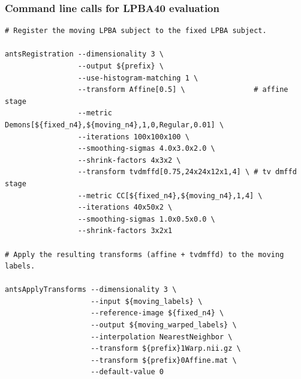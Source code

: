 \documentclass[xcolor=dvipsnames,serif,10pt]{beamer}
\begin{document}

\begin{frame}[fragile]
\frametitle{Command line calls for LPBA40 evaluation}
\begin{lstlisting}
# Register the moving LPBA subject to the fixed LPBA subject.

antsRegistration --dimensionality 3 \
                 --output ${prefix} \
                 --use-histogram-matching 1 \
                 --transform Affine[0.5] \                # affine stage
                 --metric Demons[${fixed_n4},${moving_n4},1,0,Regular,0.01] \ 
                 --iterations 100x100x100 \
                 --smoothing-sigmas 4.0x3.0x2.0 \
                 --shrink-factors 4x3x2 \
                 --transform tvdmffd[0.75,24x24x12x1,4] \ # tv dmffd stage
                 --metric CC[${fixed_n4},${moving_n4},1,4] \ 
                 --iterations 40x50x2 \
                 --smoothing-sigmas 1.0x0.5x0.0 \
                 --shrink-factors 3x2x1

# Apply the resulting transforms (affine + tvdmffd) to the moving labels.
                   
antsApplyTransforms --dimensionality 3 \
                    --input ${moving_labels} \
                    --reference-image ${fixed_n4} \
                    --output ${moving_warped_labels} \
                    --interpolation NearestNeighbor \
                    --transform ${prefix}1Warp.nii.gz \
                    --transform ${prefix}0Affine.mat \
                    --default-value 0
\end{lstlisting}                 
\end{frame}

\end{document}
